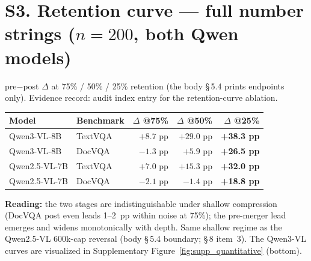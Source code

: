 \section*{S3. Retention curve --- full number strings ($n = 200$, both Qwen models)}

pre$-$post $\Delta$ at 75\% / 50\% / 25\% retention (the body \S\,5.4 prints
endpoints only). Evidence record: audit index entry for the
retention-curve ablation.

\begin{table}[ht]
  \centering
  \small
  \begin{tabular}{@{}l l r r r@{}}
    \toprule
    Model & Benchmark & $\Delta$ @75\% & $\Delta$ @50\% & $\Delta$ @25\% \\
    \midrule
    Qwen3-VL-8B   & TextVQA & $+8.7$ pp  & $+29.0$ pp & \textbf{+38.3 pp} \\
    Qwen3-VL-8B   & DocVQA  & $-1.3$ pp  & $+5.9$ pp  & \textbf{+26.5 pp} \\
    Qwen2.5-VL-7B & TextVQA & $+7.0$ pp  & $+15.3$ pp & \textbf{+32.0 pp} \\
    Qwen2.5-VL-7B & DocVQA  & $-2.1$ pp  & $-1.4$ pp  & \textbf{+18.8 pp} \\
    \bottomrule
  \end{tabular}
\end{table}

\noindent\textbf{Reading:} the two stages are indistinguishable under shallow
compression (DocVQA post even leads 1--2~pp within noise at 75\%); the
pre-merger lead emerges and widens monotonically with depth. Same shallow
regime as the Qwen2.5-VL 600k-cap reversal (body \S\,5.4
boundary; \S\,8 item~3). The Qwen3-VL curves are visualized in
Supplementary Figure~\ref{fig:supp_quantitative} (bottom).

